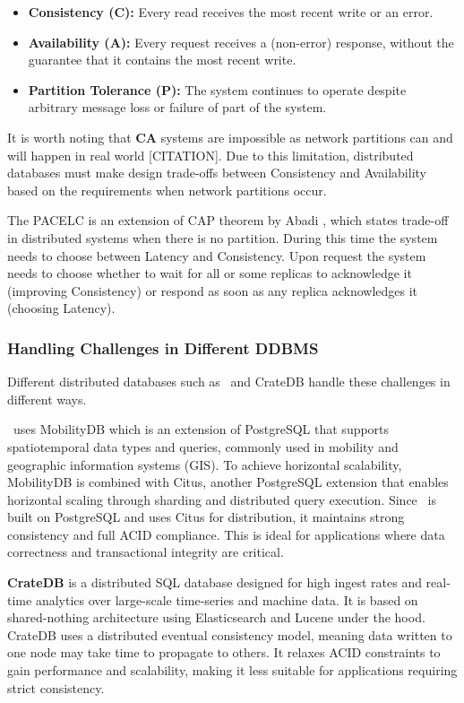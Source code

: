 \begin{itemize}
  \item \textbf{Consistency (C):} Every read receives the most recent write or an error.
  \item \textbf{Availability (A):} Every request receives a (non-error) response, without the guarantee that it contains the most recent write.
  \item \textbf{Partition Tolerance (P):} The system continues to operate despite arbitrary message loss or failure of part of the system.
\end{itemize}

It is worth noting that \textbf{CA} systems are impossible as network partitions can and will happen in real world [CITATION].
Due to this limitation, distributed databases must make design trade-offs between Consistency and Availability based on the requirements when network partitions occur.

The PACELC is an extension of CAP theorem by Abadi \parencite{abadiConsistencyTradeoffsModern2012}, which states trade-off in distributed systems when there is no partition.
During this time the system needs to choose between Latency and Consistency.
Upon request the system needs to choose whether to wait for all or some replicas to acknowledge it (improving Consistency) or respond as soon as any replica acknowledges it (choosing Latency).

\subsubsection{Handling Challenges in Different DDBMS}
Different distributed databases such as \mobilitydbc~and CrateDB handle these challenges in different ways.

\textbf{\mobilitydbc}~uses MobilityDB which is an extension of PostgreSQL that supports spatiotemporal data types and queries, commonly used in mobility and geographic information systems (GIS).
To achieve horizontal scalability, MobilityDB is combined with Citus, another PostgreSQL extension that enables horizontal scaling through sharding and distributed query execution.
Since \mobilitydbc~is built on PostgreSQL and uses Citus for distribution, it maintains strong consistency and full ACID compliance.
This is ideal for applications where data correctness and transactional integrity are critical.

\textbf{CrateDB} is a distributed SQL database designed for high ingest rates and real-time analytics over large-scale time-series and machine data.
It is based on shared-nothing architecture using Elasticsearch and Lucene under the hood.
CrateDB uses a distributed eventual consistency model, meaning data written to one node may take time to propagate to others.
It relaxes ACID constraints to gain performance and scalability, making it less suitable for applications requiring strict consistency.

